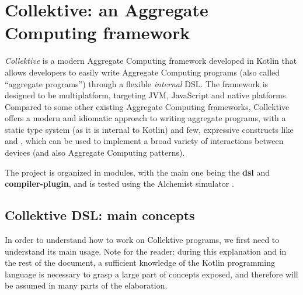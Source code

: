\documentclass[12pt,a4paper,openright,twoside]{book}
\begin{document}
\section{Collektive: an Aggregate Computing framework}

\emph{Collektive} is a modern Aggregate Computing framework developed in Kotlin
that allows developers to easily write Aggregate Computing programs (also called
``aggregate programs'') through a flexible \emph{internal} \ac{DSL}. The
framework is designed to be multiplatform, targeting JVM, JavaScript and
native platforms.
%
Compared to some other existing Aggregate Computing frameworks, Collektive
offers a modern and idiomatic approach to writing aggregate programs,
with a static type system (as it is internal to Kotlin) and few, expressive
constructs like  and , which can be
used to implement a broad variety of interactions between devices (and also
Aggregate Computing patterns).

The project is organized in modules, with the main one being the \textbf{dsl}
and \textbf{compiler-plugin}, and is tested using the Alchemist simulator
\cite{DBLP:journals/jos/PianiniMV13}. 

\subsection{Collektive DSL: main concepts} \label{sec:collektive-dsl}

In order to understand how to work on Collektive programs, we first need to
understand its main usage. Note for the reader: during this explanation and in
the rest of the document, a sufficient knowledge of the Kotlin programming
language is necessary to grasp a large part of concepts exposed, and therefore
will be assumed in many parts of the elaboration.
\end{document}
